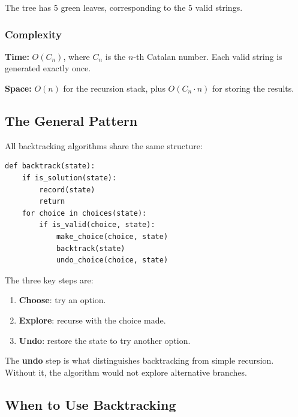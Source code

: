 \documentclass[11pt,a4paper]{article}
\begin{document}
\begin{center}
\end{center}

The tree has 5 green leaves, corresponding to the 5 valid strings.

\subsubsection{Complexity}

\textbf{Time:} $O(C_n)$, where $C_n$ is the $n$-th Catalan number. Each valid string is generated exactly once.

\textbf{Space:} $O(n)$ for the recursion stack, plus $O(C_n \cdot n)$ for storing the results.

\subsection{The General Pattern}

All backtracking algorithms share the same structure:

\begin{lstlisting}
def backtrack(state):
    if is_solution(state):
        record(state)
        return
    for choice in choices(state):
        if is_valid(choice, state):
            make_choice(choice, state)
            backtrack(state)
            undo_choice(choice, state)
\end{lstlisting}

The three key steps are:
\begin{enumerate}
    \item \textbf{Choose}: try an option.
    \item \textbf{Explore}: recurse with the choice made.
    \item \textbf{Undo}: restore the state to try another option.
\end{enumerate}

The \textbf{undo} step is what distinguishes backtracking from simple recursion. Without it, the algorithm would not explore alternative branches.

\subsection{When to Use Backtracking}
\end{document}

